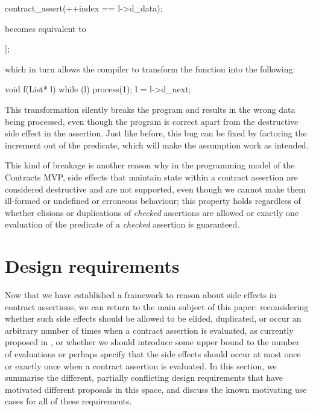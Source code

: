 \begin{codeblock}
contract_assert(++index == l->d_data);
\end{codeblock}
becomes equivalent to
\begin{codeblock}
[[assume(l->d_data == 1)]];
\end{codeblock}
which in turn allows the compiler to transform the function  into the following:
\begin{codeblock}
void f(List* l) {
  while (l) {
    process(1);
    l = l->d_next;
  }
}
\end{codeblock}
This transformation silently breaks the program and results in the wrong data being processed, even though the program is correct apart from the destructive side effect in the assertion. Just like before, this bug can be fixed by factoring the increment out of the predicate, which will make the assumption work as intended.

This kind of breakage is another reason why in the programming model of the Contracts MVP, side effects that maintain state within a contract assertion are considered destructive and are not supported, even though we cannot make them ill-formed or undefined or erroneous behaviour; this property holds regardless of whether elisions or duplications of \emph{checked} assertions are allowed or exactly one evaluation of the predicate of a \emph{checked} assertion is guaranteed.


\section{Design requirements}
\label{sec:reqs}

Now that we have established a framework to reason about side effects in contract assertions, we can return to the main subject of this paper: reconsidering whether such side effects should be allowed to be elided, duplicated, or occur an arbitrary number of times when a contract assertion is evaluated, as currently proposed in \cite{P2900R6}, or whether we should introduce some upper bound to the number of evaluations or perhaps specify that the side effects should occur at most once or exactly once when a contract assertion is evaluated. In this section, we summarise the different, partially conflicting design requirements that have motivated different proposals in this space, and discuss the known motivating use cases for all of these requirements.

